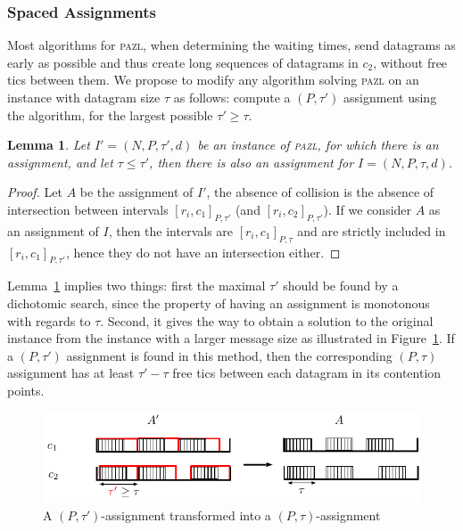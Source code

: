 \documentclass[a4paper,10pt]{article}
\newtheorem{lemma}[theorem]{Lemma}
\newcommand\pazl{\textsc{pazl}\xspace}
\begin{document}
    
    \subsubsection{Spaced Assignments}

    Most algorithms for \pazl, when determining the waiting times, send datagrams as early as possible
    and thus create long sequences of datagrams in $c_2$, without free tics between them. We propose to modify any algorithm solving \pazl on an instance with datagram size $\tau$ as follows: compute a $(P,\tau')$ assignment using the algorithm, for the largest possible $\tau' \geq \tau$. 

    \begin{lemma}\label{lemma:smaller_tau}
    Let $I' = (N,P,\tau',d)$ be an instance of \pazl, for which there is an assignment, and let 
    $\tau \leq \tau'$, then there is also an assignment for $I = (N,P,\tau,d)$.
    \end{lemma}  
    \begin{proof}
    Let $A$ be the assignment of $I'$, the absence of collision is the absence of 
    intersection between intervals $[r_i,c_1]_{P,\tau'}$ (and $[r_i,c_2]_{P,\tau'}$). 
    If we consider $A$ as an assignment of $I$, then the intervals are $[r_i,c_1]_{P,\tau}$ and 
    are strictly included in $[r_i,c_1]_{P,\tau'}$, hence they do not have an intersection either. 
    \end{proof}

    Lemma~\ref{lemma:smaller_tau} implies two things: first the maximal $\tau'$ should be found by a dichotomic search, since the property of having an assignment is monotonous with regards to $\tau$. Second, it gives the way to obtain a solution to the original instance from the instance with a larger message size as illustrated in Figure~\ref{fig:space}. If a $(P,\tau')$ assignment is found in this method, then the corresponding $(P,\tau)$ assignment has at least $\tau' - \tau$ free tics between each datagram in its contention points. 

           \begin{figure}
       \begin{center}
      \includegraphics[width = \textwidth]{space.pdf}
      \end{center} 
      \caption{A $(P,\tau')$-assignment transformed into a $(P,\tau)$-assignment}
      \label{fig:space}   
     \end{figure}   
\end{document}
